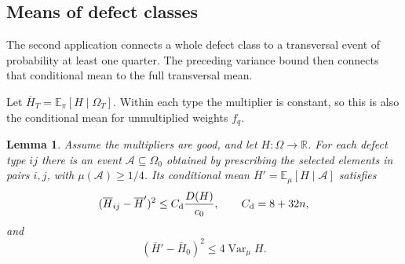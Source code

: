 \documentclass[11pt]{article}
\newtheorem{lemma}[theorem]{Lemma}
\theoremstyle{definition}
\newcommand{\E}{\mathbb E}
\newcommand{\R}{\mathbb R}
\newcommand{\Var}{\operatorname{Var}}
\newcommand{\Om}{\Omega}
\begin{document}
\subsection{Means of defect classes}

The second application connects a whole defect class to a transversal
event of probability at least one quarter.  The preceding variance
bound then connects that conditional mean to the full transversal mean.

Let $\overline H_T=\E_\pi[H\mid\Om_T]$.  Within each type the multiplier
is constant, so this is also the conditional mean for unmultiplied
weights $f_q$.

\begin{lemma}\label{lem:defecttransfer}
Assume the multipliers are good, and let $H:\Om\to\R$.
For each defect type $ij$ there is an event $\mathcal A\subseteq\Om_0$
obtained by prescribing the selected elements in pairs $i,j$, with
$\mu(\mathcal A)\ge1/4$.  Its conditional mean
$\overline H'=\E_\mu[H\mid\mathcal A]$ satisfies
\begin{equation}\label{eq:defecttransfer}
 (\overline H_{ij}-\overline H')^2
       \le C_{\rm d}\frac{D(H)}{c_0},
 \qquad C_{\rm d}=8+32n,
\end{equation}
and
\begin{equation}\label{eq:conditionalmean}
 (\overline H'-\overline H_0)^2\le4\Var_\mu H.
\end{equation}
\end{lemma}
\end{document}
